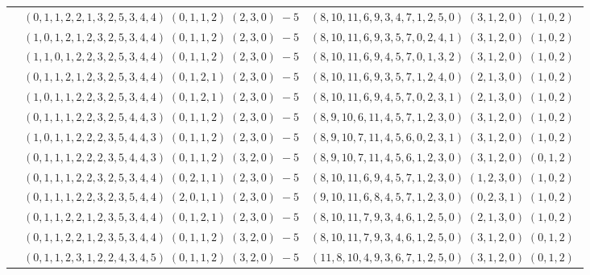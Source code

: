 \documentclass[11pt]{article}
\begin{document}
\begin{longtable}[l]{|c|c|c|}
 \cline{2-3} 
 & $(0 ,1 ,1 ,2 ,2 ,1 ,3 ,2 ,5 ,3 ,4 ,4) \;(0 ,1 ,1 ,2) \;(2 ,3 ,0) \;-5$ & $(8 ,10 ,11 ,6 ,9 ,3 ,4 ,7 ,1 ,2 ,5 ,0) \;(3 ,1 ,2 ,0) \;(1 ,0 ,2) \;$\\ 
 \cline{2-3} 
 & $(1 ,0 ,1 ,2 ,1 ,2 ,3 ,2 ,5 ,3 ,4 ,4) \;(0 ,1 ,1 ,2) \;(2 ,3 ,0) \;-5$ & $(8 ,10 ,11 ,6 ,9 ,3 ,5 ,7 ,0 ,2 ,4 ,1) \;(3 ,1 ,2 ,0) \;(1 ,0 ,2) \;$\\ 
 \cline{2-3} 
 & $(1 ,1 ,0 ,1 ,2 ,2 ,3 ,2 ,5 ,3 ,4 ,4) \;(0 ,1 ,1 ,2) \;(2 ,3 ,0) \;-5$ & $(8 ,10 ,11 ,6 ,9 ,4 ,5 ,7 ,0 ,1 ,3 ,2) \;(3 ,1 ,2 ,0) \;(1 ,0 ,2) \;$\\ 
 \cline{2-3} 
 & $(0 ,1 ,1 ,2 ,1 ,2 ,3 ,2 ,5 ,3 ,4 ,4) \;(0 ,1 ,2 ,1) \;(2 ,3 ,0) \;-5$ & $(8 ,10 ,11 ,6 ,9 ,3 ,5 ,7 ,1 ,2 ,4 ,0) \;(2 ,1 ,3 ,0) \;(1 ,0 ,2) \;$\\ 
 \cline{2-3} 
 & $(1 ,0 ,1 ,1 ,2 ,2 ,3 ,2 ,5 ,3 ,4 ,4) \;(0 ,1 ,2 ,1) \;(2 ,3 ,0) \;-5$ & $(8 ,10 ,11 ,6 ,9 ,4 ,5 ,7 ,0 ,2 ,3 ,1) \;(2 ,1 ,3 ,0) \;(1 ,0 ,2) \;$\\ 
 \cline{2-3} 
 & $(0 ,1 ,1 ,1 ,2 ,2 ,3 ,2 ,5 ,4 ,4 ,3) \;(0 ,1 ,1 ,2) \;(2 ,3 ,0) \;-5$ & $(8 ,9 ,10 ,6 ,11 ,4 ,5 ,7 ,1 ,2 ,3 ,0) \;(3 ,1 ,2 ,0) \;(1 ,0 ,2) \;$\\ 
 \cline{2-3} 
 & $(1 ,0 ,1 ,1 ,2 ,2 ,2 ,3 ,5 ,4 ,4 ,3) \;(0 ,1 ,1 ,2) \;(2 ,3 ,0) \;-5$ & $(8 ,9 ,10 ,7 ,11 ,4 ,5 ,6 ,0 ,2 ,3 ,1) \;(3 ,1 ,2 ,0) \;(1 ,0 ,2) \;$\\ 
 \cline{2-3} 
 & $(0 ,1 ,1 ,1 ,2 ,2 ,2 ,3 ,5 ,4 ,4 ,3) \;(0 ,1 ,1 ,2) \;(3 ,2 ,0) \;-5$ & $(8 ,9 ,10 ,7 ,11 ,4 ,5 ,6 ,1 ,2 ,3 ,0) \;(3 ,1 ,2 ,0) \;(0 ,1 ,2) \;$\\ 
 \cline{2-3} 
 & $(0 ,1 ,1 ,1 ,2 ,2 ,3 ,2 ,5 ,3 ,4 ,4) \;(0 ,2 ,1 ,1) \;(2 ,3 ,0) \;-5$ & $(8 ,10 ,11 ,6 ,9 ,4 ,5 ,7 ,1 ,2 ,3 ,0) \;(1 ,2 ,3 ,0) \;(1 ,0 ,2) \;$\\ 
 \cline{2-3} 
 & $(0 ,1 ,1 ,1 ,2 ,2 ,3 ,2 ,3 ,5 ,4 ,4) \;(2 ,0 ,1 ,1) \;(2 ,3 ,0) \;-5$ & $(9 ,10 ,11 ,6 ,8 ,4 ,5 ,7 ,1 ,2 ,3 ,0) \;(0 ,2 ,3 ,1) \;(1 ,0 ,2) \;$\\ 
 \cline{2-3} 
 & $(0 ,1 ,1 ,2 ,2 ,1 ,2 ,3 ,5 ,3 ,4 ,4) \;(0 ,1 ,2 ,1) \;(2 ,3 ,0) \;-5$ & $(8 ,10 ,11 ,7 ,9 ,3 ,4 ,6 ,1 ,2 ,5 ,0) \;(2 ,1 ,3 ,0) \;(1 ,0 ,2) \;$\\ 
 \cline{2-3} 
 & $(0 ,1 ,1 ,2 ,2 ,1 ,2 ,3 ,5 ,3 ,4 ,4) \;(0 ,1 ,1 ,2) \;(3 ,2 ,0) \;-5$ & $(8 ,10 ,11 ,7 ,9 ,3 ,4 ,6 ,1 ,2 ,5 ,0) \;(3 ,1 ,2 ,0) \;(0 ,1 ,2) \;$\\ 
 \cline{2-3} 
 & $(0 ,1 ,1 ,2 ,3 ,1 ,2 ,2 ,4 ,3 ,4 ,5) \;(0 ,1 ,1 ,2) \;(3 ,2 ,0) \;-5$ & $(11 ,8 ,10 ,4 ,9 ,3 ,6 ,7 ,1 ,2 ,5 ,0) \;(3 ,1 ,2 ,0) \;(0 ,1 ,2) \;$\\ 

\end{longtable}
\end{document}
